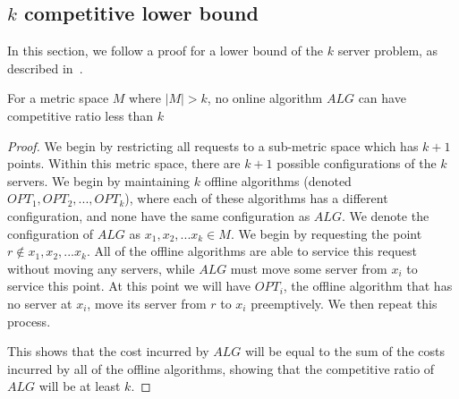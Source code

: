 \subsection{$k$ competitive lower bound}
\label{sec:lowerBound}

In this section, we follow a proof for a lower bound of the $k$ server problem, as described in~\cite{server2009}. 

\begin{lemma}
    For a metric space $M$ where $|M| > k$, no online algorithm $ALG$ can have competitive ratio less than $k$
\end{lemma}

\begin{proof}
    We begin by restricting all requests to a sub-metric space which has $k+1$ points. Within this metric space, there are $k+1$ possible configurations of the $k$ servers. We begin by maintaining $k$ offline algorithms (denoted $OPT_1, OPT_2, ..., OPT_k$), where each of these algorithms has a different configuration, and none have the same configuration as $ALG$. We denote the configuration of $ALG$ as $x_1, x_2, ...x_k \in M$. We begin by requesting the point $r \not \in x_1, x_2, ...x_k$. All of the offline algorithms are able to service this request without moving any servers, while $ALG$ must move some server from $x_i$ to service this point. At this point we will have $OPT_i$, the offline algorithm that has no server at $x_i$, move its server from $r$ to $x_i$ preemptively. We then repeat this process.

    This shows that the cost incurred by $ALG$ will be equal to the sum of the costs incurred by all of the offline algorithms, showing that the competitive ratio of $ALG$ will be at least $k$.
\end{proof}